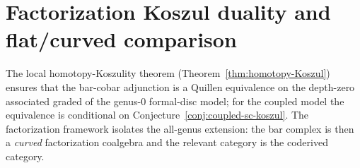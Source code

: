 \section{Factorization Koszul duality and flat/curved comparison}
\label{sec:factorization-koszul-duality}

The local homotopy-Koszulity theorem
(Theorem~\ref{thm:homotopy-Koszul}) ensures that the bar-cobar
adjunction is a Quillen equivalence on the depth-zero associated
graded of the genus-$0$ formal-disc model; for the coupled model
the equivalence is conditional on
Conjecture~\ref{conj:coupled-sc-koszul}. The factorization framework isolates the all-genus extension:
the bar complex is then a \emph{curved} factorization coalgebra and
the relevant category is the coderived category.


